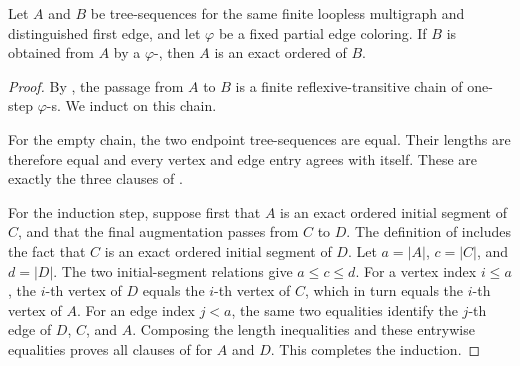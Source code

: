 \begin{lemma}
Let $A$ and $B$ be tree-sequences for the same finite loopless
multigraph and distinguished first edge, and let $\varphi$ be a fixed
partial edge coloring.  If $B$ is obtained from $A$ by a
$\varphi$-, then $A$ is an exact
ordered  of $B$.
\end{lemma}
\begin{proof}
By , the passage from $A$ to $B$
is a finite reflexive-transitive chain of one-step
$\varphi$-s.  We induct on this chain.

For the empty chain, the two endpoint tree-sequences are equal.  Their
lengths are therefore equal and every vertex and edge entry agrees with
itself.  These are exactly the three clauses of
.

For the induction step, suppose first that $A$ is an exact ordered
initial segment of $C$, and that the final augmentation passes from
$C$ to $D$.  The definition of
 includes the fact that $C$ is an exact
ordered initial segment of $D$.  Let $a=|A|$, $c=|C|$, and
$d=|D|$.  The two initial-segment relations give $a\leq c\leq d$.
For a vertex index $i\leq a$, the $i$-th vertex of $D$ equals the
$i$-th vertex of $C$, which in turn equals the $i$-th vertex of
$A$.  For an edge index $j<a$, the same two equalities identify the
$j$-th edge of $D$, $C$, and $A$.  Composing the length
inequalities and these entrywise equalities proves all clauses of
 for $A$ and $D$.  This completes
the induction.
\end{proof}
